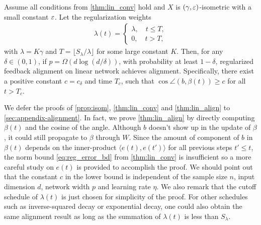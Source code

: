 \begin{theorem}
\label{thm:lin_align}
Assume all conditions from \cref{thm:lin_conv} hold and $X$ is $(\gamma, \varepsilon)$-isometric with a small constant $\varepsilon$. Let the regularization weights
\begin{align*}
\lambda(t) = 
\begin{cases}
    \lambda, \quad t\leq T,\\
    0, \quad t > T,
\end{cases}
\end{align*}
with $\lambda=K\gamma$ and $T = \lfloor S_\lambda/\lambda\rfloor$ for some large constant $K$. Then, for any $\delta\in(0,1)$, if $p = \Omega(d\log(d/\delta))$, with probability at least $1-\delta$, regularized feedback alignment on linear network achieves alignment. Specifically, there exist a positive constant $c=c_\delta$ and time $T_c$, such that $\cos\angle(b, \beta(t))\geq c$ for all $t>T_c$.
\end{theorem}

We defer the proofs of \cref{prop:isom}, \cref{thm:lin_conv} and \cref{thm:lin_align} to \cref{sec:appendix-alignment}. In fact, we prove \cref{thm:lin_align} by directly computing $\beta(t)$ and the cosine of the angle. Although $b$ doesn't show up in the update of $\beta$, it could still propagate to $\beta$ through $W$. Since the amount of component of $b$ in $\beta(t)$ depends on the inner-product $\langle e(t), e(t')\rangle$ for all previous steps $t'\leq t$, the norm bound \eqref{eq:reg_error_bd} from \cref{thm:lin_conv} is insufficient so a more careful study on $e(t)$ is provided to accomplish the proof. We should point out that the constant $c$ in the lower bound is independent of the sample size $n$, input dimension $d$, network width $p$ and learning rate $\eta$. We also remark that the cutoff schedule of $\lambda(t)$ is just chosen for simplicity of the proof. For other schedules such as inverse-squared decay or exponential decay, one could also obtain the same alignment result as long as the summation of $\lambda(t)$ is less than $S_\lambda$.


